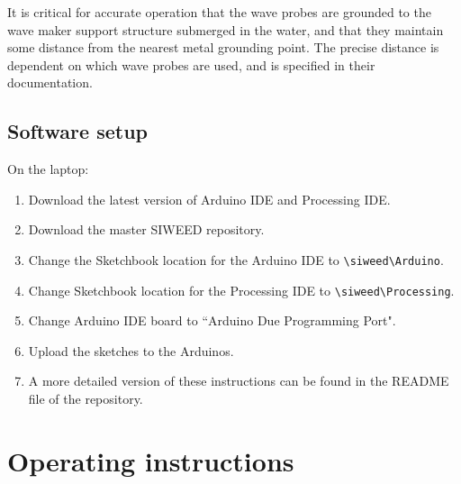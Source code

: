 \documentclass[hardware,article,submit,pdftex,moreauthors]{Definitions/mdpi}
\begin{document}
It is critical for accurate operation that the wave probes are grounded to the wave maker support structure submerged in the water, and that they maintain some distance from the nearest metal grounding point.
The precise distance is dependent on which wave probes are used, and is specified in their documentation.

\subsection{Software setup}
On the laptop:
\begin{enumerate}
\item Download the latest version of Arduino IDE and Processing IDE.
\item Download the master SIWEED repository.
\item Change the Sketchbook location for the Arduino IDE to \texttt{\textbackslash siweed\textbackslash Arduino}.
\item Change Sketchbook location for the Processing IDE to \texttt{\textbackslash siweed\textbackslash Processing}.
\item Change Arduino IDE board to ``Arduino Due Programming Port".
\item Upload the sketches to the Arduinos.
\item A more detailed version of these instructions can be found in the README file of the repository.
\end{enumerate}

\section{Operating instructions}
\end{document}
